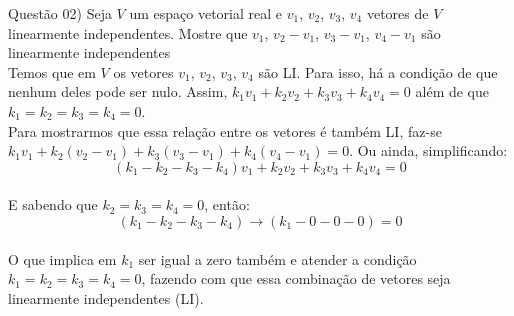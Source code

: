 
\noindent \textcolor{COLOR1}{Questão 02)} Seja $V$ um espaço vetorial real e $v_1$, $v_2$, $v_3$, $v_4$ vetores de $V$ linearmente independentes. Mostre que $v_1$, $v_2-v_1$, $v_3-v_1$, $v_4-v_1$ são linearmente independentes
\\

Temos que em $V$ os vetores $v_1$, $v_2$, $v_3$, $v_4$ são LI. Para isso, há a condição de que nenhum deles pode ser nulo. Assim, $k_1v_1+ k_2v_2 + k_3v_3 + k_4v_4 = 0 $ além de que $k_1=k_2=k_3=k_4=0$.
\\

Para mostrarmos que essa relação entre os vetores é também LI, faz-se $k_1v_1+k_2(v_2-v_1)+k_3(v_3-v_1) + k_4(v_4-v_1)=0$. Ou ainda, simplificando:
\\

\[
    (k_1-k_2-k_3-k_4)v_1 + k_2v_2 + k_3v_3 + k_4v_4 = 0
\]
\\

E sabendo que $k_2=k_3=k_4=0$, então:
\\

\[
    (k_1-k_2-k_3-k_4)\to (k_1-0-0-0)=0
\]
\\

O que implica em $k_1$ ser igual a zero também e atender a condição $k_1=k_2=k_3=k_4=0$, fazendo com que essa combinação de vetores seja linearmente independentes (LI).\\
